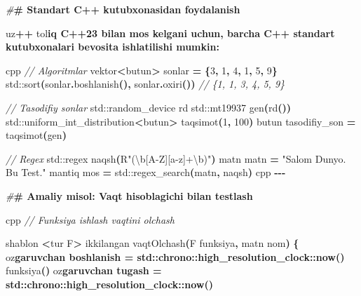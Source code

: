 \documentclass[a4paper,11pt,twoside,openright]{book}
\newenvironment{Shaded}{\begin{snugshade}}{\end{snugshade}}
\newcommand{\BuiltInTok}[1]{#1}
\newcommand{\CharTok}[1]{\textcolor[rgb]{0.31,0.60,0.02}{#1}}
\newcommand{\CommentTok}[1]{\textcolor[rgb]{0.56,0.35,0.01}{\textit{#1}}}
\newcommand{\DecValTok}[1]{\textcolor[rgb]{0.00,0.00,0.81}{#1}}
\newcommand{\ErrorTok}[1]{\textcolor[rgb]{0.64,0.00,0.00}{\textbf{#1}}}
\newcommand{\NormalTok}[1]{#1}
\newcommand{\OperatorTok}[1]{\textcolor[rgb]{0.81,0.36,0.00}{\textbf{#1}}}
\newcommand{\PreprocessorTok}[1]{\textcolor[rgb]{0.56,0.35,0.01}{\textit{#1}}}
\newcommand{\StringTok}[1]{\textcolor[rgb]{0.31,0.60,0.02}{#1}}
\newcommand{\VerbatimStringTok}[1]{\textcolor[rgb]{0.31,0.60,0.02}{#1}}
\begin{document}
\begin{Shaded}
\begin{Highlighting}[]
\PreprocessorTok{\#}\ErrorTok{\# Standart C++ kutubxonasidan foydalanish}

\NormalTok{uz}\OperatorTok{++}\NormalTok{ to}\CharTok{\textquotesingle{}l}\ErrorTok{iq C++23 bilan mos kelgani uchun, barcha C++ standart kutubxonalari bevosita ishlatilishi mumkin:}

\ErrorTok{\textasciigrave{}\textasciigrave{}\textasciigrave{}}\NormalTok{cpp}
\CommentTok{// Algoritmlar}
\NormalTok{vektor}\OperatorTok{\textless{}}\NormalTok{butun}\OperatorTok{\textgreater{}}\NormalTok{ sonlar }\OperatorTok{=} \OperatorTok{\{}\DecValTok{3}\OperatorTok{,} \DecValTok{1}\OperatorTok{,} \DecValTok{4}\OperatorTok{,} \DecValTok{1}\OperatorTok{,} \DecValTok{5}\OperatorTok{,} \DecValTok{9}\OperatorTok{\}}
\BuiltInTok{std::}\NormalTok{sort}\OperatorTok{(}\NormalTok{sonlar}\OperatorTok{.}\NormalTok{boshlanish}\OperatorTok{(),}\NormalTok{ sonlar}\OperatorTok{.}\NormalTok{oxiri}\OperatorTok{())}
\CommentTok{// \{1, 1, 3, 4, 5, 9\}}

\CommentTok{// Tasodifiy sonlar}
\BuiltInTok{std::}\NormalTok{random\_device rd}
\BuiltInTok{std::}\NormalTok{mt19937 gen}\OperatorTok{(}\NormalTok{rd}\OperatorTok{())}
\BuiltInTok{std::}\NormalTok{uniform\_int\_distribution}\OperatorTok{\textless{}}\NormalTok{butun}\OperatorTok{\textgreater{}}\NormalTok{ taqsimot}\OperatorTok{(}\DecValTok{1}\OperatorTok{,} \DecValTok{100}\OperatorTok{)}
\NormalTok{butun tasodifiy\_son }\OperatorTok{=}\NormalTok{ taqsimot}\OperatorTok{(}\NormalTok{gen}\OperatorTok{)}

\CommentTok{// Regex}
\BuiltInTok{std::}\NormalTok{regex naqsh}\OperatorTok{(}\StringTok{R"(}\VerbatimStringTok{\textbackslash{}b[A{-}Z][a{-}z]+\textbackslash{}b}\StringTok{)"}\OperatorTok{)}
\NormalTok{matn matn }\OperatorTok{=} \StringTok{"Salom Dunyo. Bu Test."}
\NormalTok{mantiq mos }\OperatorTok{=} \BuiltInTok{std::}\NormalTok{regex\_search}\OperatorTok{(}\NormalTok{matn}\OperatorTok{,}\NormalTok{ naqsh}\OperatorTok{)}
\ErrorTok{\textasciigrave{}\textasciigrave{}\textasciigrave{}}\NormalTok{cpp}
\OperatorTok{{-}{-}{-}}

\PreprocessorTok{\#}\ErrorTok{\# Amaliy misol: Vaqt hisoblagichi bilan testlash}

\ErrorTok{\textasciigrave{}\textasciigrave{}\textasciigrave{}}\NormalTok{cpp}
\CommentTok{// Funksiya ishlash vaqtini o\textquotesingle{}lchash}

\NormalTok{shablon }\OperatorTok{\textless{}}\NormalTok{tur F}\OperatorTok{\textgreater{}}
\NormalTok{ikkilangan vaqtOlchash}\OperatorTok{(}\NormalTok{F funksiya}\OperatorTok{,}\NormalTok{ matn nom}\OperatorTok{)} \OperatorTok{\{}
\NormalTok{    o}\CharTok{\textquotesingle{}z}\ErrorTok{garuvchan boshlanish = std::chrono::high\_resolution\_clock::now()}
\NormalTok{    funksiya}\OperatorTok{()}
\NormalTok{    o}\CharTok{\textquotesingle{}z}\ErrorTok{garuvchan tugash = std::chrono::high\_resolution\_clock::now()}


\end{Highlighting}
\end{Shaded}
\end{document}
